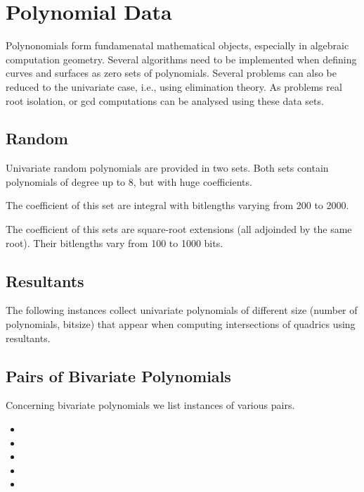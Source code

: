 \section{Polynomial Data}

Polynonomials form fundamenatal mathematical objects, especially
in algebraic computation geometry. Several algorithms need to be implemented
when defining curves and surfaces as zero sets of polynomials. Several
problems can also be reduced to the univariate case, i.e., using elimination
theory. As problems real root isolation, or gcd computations can be
analysed using these data sets.

\subsection{Random}

Univariate random polynomials are provided in two sets. Both sets contain
polynomials of degree up to 8, but with huge coefficients.

The coefficient of this set are integral with bitlengths varying from
200 to 2000. 


The coefficient of this sets are square-root extensions (all adjoinded
by the same root). Their bitlengths vary from 100 to 1000 bits.


\subsection{Resultants}

The following instances collect univariate polynomials
of different size (number of polynomials, bitsize) that appear
when computing intersections of quadrics using resultants.


\subsection{Pairs of Bivariate Polynomials}

Concerning bivariate polynomials we list instances of various pairs.
\begin{itemize}
\item {}
\item {}
\item {}
\item {}
\item {}
\end{itemize}


